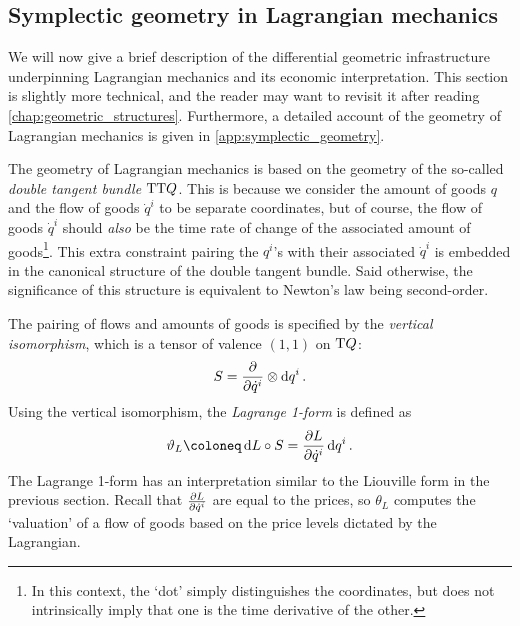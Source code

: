 \subsection{Symplectic geometry in Lagrangian mechanics} 
We will now give a brief description of the differential geometric infrastructure underpinning Lagrangian mechanics and its economic interpretation. This section is slightly more technical, and the reader may want to revisit it after reading \cref{chap:geometric_structures}. 
Furthermore, a detailed account of the geometry of Lagrangian mechanics is given in  \cref{app:symplectic_geometry}. 

The geometry of Lagrangian mechanics is based on the geometry of the so-called \emph{double tangent bundle} \(\mathrm{T}\mathrm{T}Q\). This is because we consider the amount of goods \(q\) and the flow of goods \(\dot{q}^i\) to be separate coordinates, but of course, the flow of goods \(\dot{q}^i\) should \emph{also} be the time rate of change of the associated amount of goods\footnote{In this context, the `dot' simply distinguishes the coordinates, but does not intrinsically imply that one is the time derivative of the other.}. This extra constraint pairing the \(q^i\)'s with their associated \(\dot{q}^i\) is embedded in the canonical structure of the double tangent bundle. Said otherwise, the significance of this structure is equivalent to Newton's law being second-order.

The pairing of flows and amounts of goods is specified by the \emph{vertical isomorphism}, which is a tensor of valence \((1,1)\) on \(\mathrm{T}Q\): \cite{Carinena1990}
\begin{equation}
    S = \pdv{}{\dot{q}^i}\otimes \dd{q^i}.
\end{equation}
Using the vertical isomorphism, the \emph{Lagrange 1-form} is defined as
\begin{equation}
    \theta_L \coloneq \dd{L}\circ S = \pdv{L}{\dot{q}^i}\dd{q^i}.
\end{equation}
The Lagrange 1-form has an interpretation similar to the Liouville form in the previous section. Recall that \(\pdv{L}{\dot{q}^i}\) are equal to the prices, so \(\theta_L\) computes the `valuation' of a flow of goods based on the price levels dictated by the Lagrangian. 

